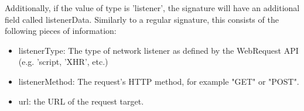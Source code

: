Additionally, if the value of type is 'listener', the signature will have an additional field called listenerData. Similarly to a regular signature, this consists of the following pieces of information:
\begin{itemize}
	\item 
	listenerType: The type of network listener as defined by the WebRequest API (e.g. 'script, 'XHR', etc.)
	\item
	listenerMethod: The request's HTTP method, for example "GET" or "POST".
	\item
	url: the URL of the request target.
\end{itemize}